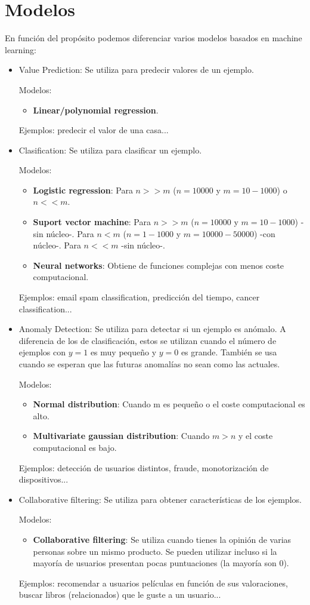 \documentclass[12pt,a4paper]{article}
\begin{document}
\section{Modelos}
En función del propósito podemos diferenciar varios modelos basados en machine learning:
\begin{itemize}
\item Value Prediction: Se utiliza para predecir valores de un ejemplo.

Modelos:
\begin{itemize}
\item \textbf{Linear/polynomial regression}.
\end{itemize}
Ejemplos: predecir el valor de una casa...
\item Clasification: Se utiliza para clasificar un ejemplo.

Modelos:
\begin{itemize}
\item \textbf{Logistic regression}: Para $n>>m$ ($n=10000$ y $m=10-1000$) o $n<<m$.
\item \textbf{Suport vector machine}: Para $n>>m$ ($n=10000$ y $m=10-1000$) -sin núcleo-. Para $n<m$ ($n=1-1000$ y $m=10000-50000$) -con núcleo-. Para $n<<m$ -sin núcleo-.
\item \textbf{Neural networks}: Obtiene de funciones complejas con menos coste computacional.
\end{itemize}
Ejemplos: email spam classification, predicción del tiempo, cancer classification...
\item Anomaly Detection: Se utiliza para detectar si un ejemplo es anómalo. A diferencia de los de clasificación, estos se utilizan cuando el número de ejemplos con $y=1$ es muy pequeño y $y=0$ es grande. También se usa cuando se esperan que las futuras anomalías no sean como las actuales.

Modelos:
\begin{itemize}
\item \textbf{Normal distribution}: Cuando m es pequeño o el coste computacional es alto.
\item \textbf{Multivariate gaussian distribution}: Cuando $m>n$ y el coste computacional es bajo.
\end{itemize}
Ejemplos: detección de usuarios distintos, fraude, monotorización de dispositivos...
\item Collaborative filtering: Se utiliza para obtener características de los ejemplos.

Modelos:
\begin{itemize}
\item \textbf{Collaborative filtering}: Se utiliza cuando tienes la opinión de varias personas sobre un mismo producto. Se pueden utilizar incluso si la mayoría de usuarios presentan pocas puntuaciones (la mayoría son 0).
\end{itemize}
Ejemplos: recomendar a usuarios películas en función de sus valoraciones, buscar libros (relacionados) que le guste a un usuario... 


\end{itemize}
\end{document}
